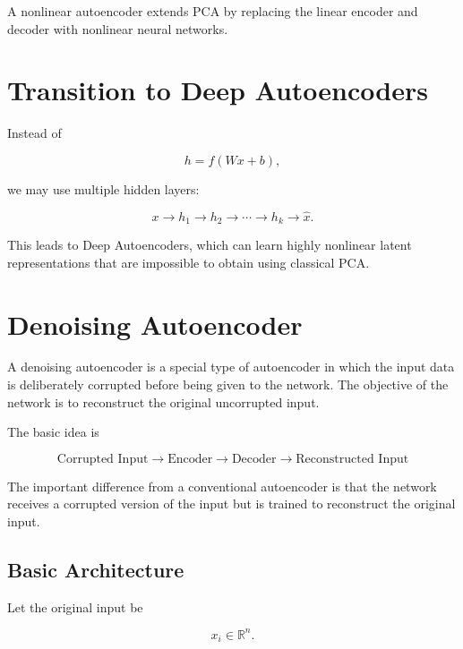 \documentclass{article}
\begin{document}
A nonlinear autoencoder extends PCA by replacing the linear encoder and
decoder with nonlinear neural networks.

\section{Transition to Deep Autoencoders}

Instead of

\[
h=f(Wx+b),
\]

we may use multiple hidden layers:

\[
x
\rightarrow
h_1
\rightarrow
h_2
\rightarrow
\cdots
\rightarrow
h_k
\rightarrow
\hat{x}.
\]

This leads to Deep Autoencoders, which can learn highly nonlinear latent
representations that are impossible to obtain using classical PCA.

\section{Denoising Autoencoder}

A denoising autoencoder is a special type of autoencoder in which the
input data is deliberately corrupted before being given to the
network. The objective of the network is to reconstruct the original
uncorrupted input.

The basic idea is

\[
\boxed{
	\text{Corrupted Input}
	\longrightarrow
	\text{Encoder}
	\longrightarrow
	\text{Decoder}
	\longrightarrow
	\text{Reconstructed Input}
}
\]

The important difference from a conventional autoencoder is that the
network receives a corrupted version of the input but is trained to
reconstruct the original input.

\subsection{Basic Architecture}

Let the original input be

\[
x_i \in \mathbb{R}^{n}.
\]
\end{document}

